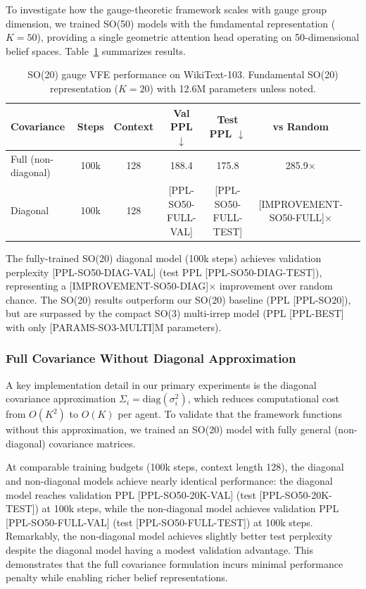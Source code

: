 \documentclass[twoside,11pt]{article}
\begin{document}
To investigate how the gauge-theoretic framework scales with gauge group dimension, we trained SO(50) models with the fundamental representation ($K = 50$), providing a single geometric attention head operating on 50-dimensional belief spaces. Table~\ref{tab:so50_results} summarizes results.

\begin{table}[h]
\centering
\small
\caption{SO(20) gauge VFE performance on WikiText-103. Fundamental SO(20) representation ($K=20$) with 12.6M parameters unless noted.}
\label{tab:so50_results}
\begin{tabular}{lcccccc}
\toprule
\textbf{Covariance} & \textbf{Steps} & \textbf{Context} & \textbf{Val PPL} $\downarrow$ & \textbf{Test PPL} $\downarrow$ & \textbf{vs Random} \\
\midrule
Full (non-diagonal) & 100k & 128 & 188.4 & 175.8 & 285.9$\times$ \\
Diagonal & 100k & 128 & [PPL-SO50-FULL-VAL] & [PPL-SO50-FULL-TEST] & [IMPROVEMENT-SO50-FULL]$\times$ \\
\bottomrule
\end{tabular}
\end{table}

The fully-trained SO(20) diagonal model (100k steps) achieves validation perplexity [PPL-SO50-DIAG-VAL] (test PPL [PPL-SO50-DIAG-TEST]), representing a [IMPROVEMENT-SO50-DIAG]$\times$ improvement over random chance. The SO(20) results outperform our SO(20) baseline (PPL [PPL-SO20]), but are surpassed by the compact SO(3) multi-irrep model (PPL [PPL-BEST] with only [PARAMS-SO3-MULTI]M parameters).

\subsubsection{Full Covariance Without Diagonal Approximation}

A key implementation detail in our primary experiments is the diagonal covariance approximation $\Sigma_i = \text{diag}(\sigma_i^2)$, which reduces computational cost from $O(K^2)$ to $O(K)$ per agent. To validate that the framework functions without this approximation, we trained an SO(20) model with fully general (non-diagonal) covariance matrices.

At comparable training budgets (100k steps, context length 128), the diagonal and non-diagonal models achieve nearly identical performance: the diagonal model reaches validation PPL [PPL-SO50-20K-VAL] (test [PPL-SO50-20K-TEST]) at 100k steps, while the non-diagonal model achieves validation PPL [PPL-SO50-FULL-VAL] (test [PPL-SO50-FULL-TEST]) at 100k steps. Remarkably, the non-diagonal model achieves slightly better test perplexity despite the diagonal model having a modest validation advantage. This demonstrates that the full covariance formulation incurs minimal performance penalty while enabling richer belief representations.
\end{document}
